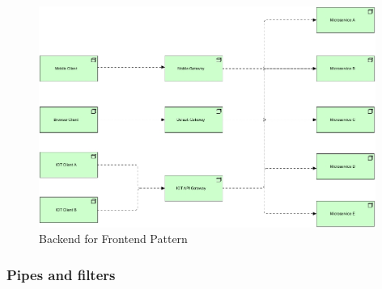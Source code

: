 \documentclass{bmcart}
\begin{document}



\begin{figure}[h]
  \includegraphics[width=11cm]{Media/Backend for Frontend.jpg}
  \caption{Backend for Frontend Pattern}
  \label{backend-for-fronted}
\end{figure}

\subsubsection{Pipes and filters}
\end{document}
